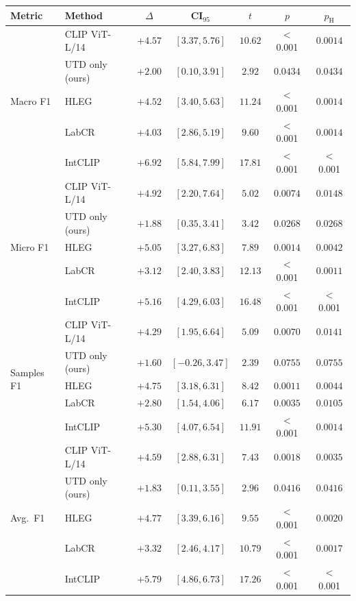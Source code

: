 \setlength{\tabcolsep}{4pt}
\begin{tabular}{llccccc}
\hline
Metric & Method & $\Delta$ & CI$_{95}$ & $t$ & $p$ & $p_{\text{H}}$ \\
\hline
\multirow{5}{*}{Macro F1}
& CLIP ViT-L/14 & $+4.57$ & $[3.37, 5.76]$ & $10.62$ & $<$0.001 & $0.0014$ \\
& UTD only (ours) & $+2.00$ & $[0.10, 3.91]$ & $2.92$ & $0.0434$ & $0.0434$ \\
& HLEG & $+4.52$ & $[3.40, 5.63]$ & $11.24$ & $<$0.001 & $0.0014$ \\
& LabCR & $+4.03$ & $[2.86, 5.19]$ & $9.60$ & $<$0.001 & $0.0014$ \\
& IntCLIP & $+6.92$ & $[5.84, 7.99]$ & $17.81$ & $<$0.001 & $<$0.001 \\
\hline
\multirow{5}{*}{Micro F1}
& CLIP ViT-L/14 & $+4.92$ & $[2.20, 7.64]$ & $5.02$ & $0.0074$ & $0.0148$ \\
& UTD only (ours) & $+1.88$ & $[0.35, 3.41]$ & $3.42$ & $0.0268$ & $0.0268$ \\
& HLEG & $+5.05$ & $[3.27, 6.83]$ & $7.89$ & $0.0014$ & $0.0042$ \\
& LabCR & $+3.12$ & $[2.40, 3.83]$ & $12.13$ & $<$0.001 & $0.0011$ \\
& IntCLIP & $+5.16$ & $[4.29, 6.03]$ & $16.48$ & $<$0.001 & $<$0.001 \\
\hline
\multirow{5}{*}{Samples F1}
& CLIP ViT-L/14 & $+4.29$ & $[1.95, 6.64]$ & $5.09$ & $0.0070$ & $0.0141$ \\
& UTD only (ours) & $+1.60$ & $[-0.26, 3.47]$ & $2.39$ & $0.0755$ & $0.0755$ \\
& HLEG & $+4.75$ & $[3.18, 6.31]$ & $8.42$ & $0.0011$ & $0.0044$ \\
& LabCR & $+2.80$ & $[1.54, 4.06]$ & $6.17$ & $0.0035$ & $0.0105$ \\
& IntCLIP & $+5.30$ & $[4.07, 6.54]$ & $11.91$ & $<$0.001 & $0.0014$ \\
\hline
\multirow{5}{*}{Avg.\ F1}
& CLIP ViT-L/14 & $+4.59$ & $[2.88, 6.31]$ & $7.43$ & $0.0018$ & $0.0035$ \\
& UTD only (ours) & $+1.83$ & $[0.11, 3.55]$ & $2.96$ & $0.0416$ & $0.0416$ \\
& HLEG & $+4.77$ & $[3.39, 6.16]$ & $9.55$ & $<$0.001 & $0.0020$ \\
& LabCR & $+3.32$ & $[2.46, 4.17]$ & $10.79$ & $<$0.001 & $0.0017$ \\
& IntCLIP & $+5.79$ & $[4.86, 6.73]$ & $17.26$ & $<$0.001 & $<$0.001 \\

\end{tabular}

